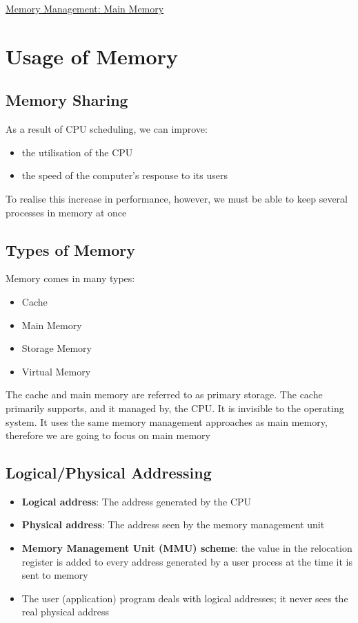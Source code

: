 \documentclass{article}[18pt]
\begin{document}
\begin{center}
\underline{\huge Memory Management: Main Memory}
\end{center}
\section{Usage of Memory}
\subsection{Memory Sharing}
As a result of CPU scheduling, we can improve:
\begin{itemize}
	\item the utilisation of the CPU
	\item the speed of the computer's response to its users
\end{itemize}
To realise this increase in performance, however, we must be able to keep several processes in memory at once
\subsection{Types of Memory}
Memory comes in many types:
\begin{itemize}
	\item Cache
	\item Main Memory
	\item Storage Memory
	\item Virtual Memory
\end{itemize}
The cache and main memory are referred to as primary storage. The cache primarily supports, and it managed by, the CPU. It is invisible to the operating system. It uses the same memory management approaches as main memory, therefore we are going to focus on main memory
\subsection{Logical/Physical Addressing}
\begin{itemize}
	\item \textbf{Logical address}: The address generated by the CPU
	\item \textbf{Physical address}: The address seen by the memory management unit
	\item \textbf{Memory Management Unit (MMU) scheme}: the value in the relocation register is added to every address generated by a user process at the time it is sent to memory
	\item The user (application) program deals with logical addresses; it never sees the real physical address
\end{itemize}
\end{document}
